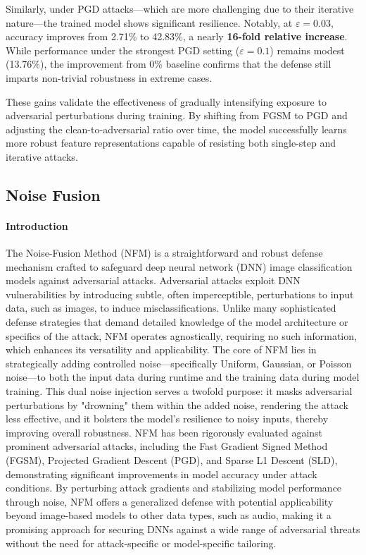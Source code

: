 \documentclass[../main.tex]{subfiles}
\begin{document}
Similarly, under PGD attacks---which are more challenging due to their iterative nature---the trained model shows significant resilience. Notably, at $\varepsilon = 0.03$, accuracy improves from  2.71\% to 42.83\%, a nearly \textbf{16-fold relative increase}. While performance under the strongest PGD setting ($\varepsilon = 0.1$) remains modest (13.76\%), the improvement from 0\% baseline confirms that the defense still imparts non-trivial robustness in extreme cases.

These gains validate the effectiveness of gradually intensifying exposure to adversarial perturbations during training. By shifting from FGSM to PGD and adjusting the clean-to-adversarial ratio over time, the model successfully learns more robust feature representations capable of resisting both single-step and iterative attacks.

\clearpage

\subsection{Noise Fusion}
\paragraph{Introduction}
The Noise-Fusion Method (NFM) is a straightforward and robust defense mechanism crafted to safeguard deep neural network (DNN) image classification models against adversarial attacks. Adversarial attacks exploit DNN vulnerabilities by introducing subtle, often imperceptible, perturbations to input data, such as images, to induce misclassifications. Unlike many sophisticated defense strategies that demand detailed knowledge of the model architecture or specifics of the attack, NFM operates agnostically, requiring no such information, which enhances its versatility and applicability. The core of NFM lies in strategically adding controlled noise—specifically Uniform, Gaussian, or Poisson noise—to both the input data during runtime and the training data during model training. This dual noise injection serves a twofold purpose: it masks adversarial perturbations by "drowning" them within the added noise, rendering the attack less effective, and it bolsters the model’s resilience to noisy inputs, thereby improving overall robustness. NFM has been rigorously evaluated against prominent adversarial attacks, including the Fast Gradient Signed Method (FGSM), Projected Gradient Descent (PGD), and Sparse L1 Descent (SLD), demonstrating significant improvements in model accuracy under attack conditions. By perturbing attack gradients and stabilizing model performance through noise, NFM offers a generalized defense with potential applicability beyond image-based models to other data types, such as audio, making it a promising approach for securing DNNs against a wide range of adversarial threats without the need for attack-specific or model-specific tailoring.
\cite{shi2022noisefusion}
\end{document}
